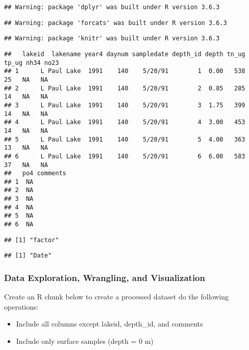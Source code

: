 \documentclass[
]{article}
\providecommand{\tightlist}{%
  \setlength{\itemsep}{0pt}\setlength{\parskip}{0pt}}
\begin{document}
\begin{verbatim}
## Warning: package 'dplyr' was built under R version 3.6.3
\end{verbatim}

\begin{verbatim}
## Warning: package 'forcats' was built under R version 3.6.3
\end{verbatim}

\begin{verbatim}
## Warning: package 'knitr' was built under R version 3.6.3
\end{verbatim}

\begin{verbatim}
##   lakeid  lakename year4 daynum sampledate depth_id depth tn_ug tp_ug nh34 no23
## 1      L Paul Lake  1991    140    5/20/91        1  0.00   538    25   NA   NA
## 2      L Paul Lake  1991    140    5/20/91        2  0.85   285    14   NA   NA
## 3      L Paul Lake  1991    140    5/20/91        3  1.75   399    14   NA   NA
## 4      L Paul Lake  1991    140    5/20/91        4  3.00   453    14   NA   NA
## 5      L Paul Lake  1991    140    5/20/91        5  4.00   363    13   NA   NA
## 6      L Paul Lake  1991    140    5/20/91        6  6.00   583    37   NA   NA
##   po4 comments
## 1  NA         
## 2  NA         
## 3  NA         
## 4  NA         
## 5  NA         
## 6  NA
\end{verbatim}

\begin{verbatim}
## [1] "factor"
\end{verbatim}

\begin{verbatim}
## [1] "Date"
\end{verbatim}

\hypertarget{data-exploration-wrangling-and-visualization}{%
\subsubsection{Data Exploration, Wrangling, and
Visualization}\label{data-exploration-wrangling-and-visualization}}

Create an R chunk below to create a processed dataset do the following
operations:

\begin{itemize}
\tightlist
\item
  Include all columns except lakeid, depth\_id, and comments
\item
  Include only surface samples (depth = 0 m)
\end{itemize}
\end{document}
